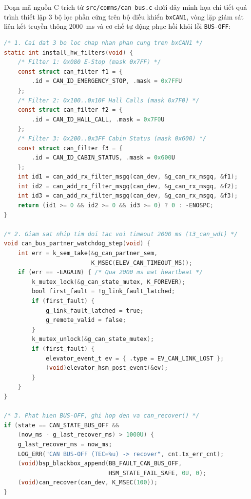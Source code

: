 \pagebreak
Đoạn mã nguồn C trích từ \texttt{src/comms/can\_bus.c} dưới đây minh họa chi tiết quá trình thiết lập 3 bộ lọc phần cứng trên bộ điều khiển \texttt{bxCAN1}, vòng lặp giám sát liên kết truyền thông 2000~ms và cơ chế tự động phục hồi khỏi lỗi \texttt{BUS-OFF}:

\begin{lstlisting}[language=C, caption={Cấu hình 3 bộ lọc phần cứng (can\_bus.c) và giám sát liên kết CAN 2000~ms (t3\_can\_wdt)}]
/* 1. Cai dat 3 bo loc chap nhan phan cung tren bxCAN1 */
static int install_hw_filters(void) {
    /* Filter 1: 0x080 E-Stop (mask 0x7FF) */
    const struct can_filter f1 = {
        .id = CAN_ID_EMERGENCY_STOP, .mask = 0x7FFU
    };
    /* Filter 2: 0x100..0x10F Hall Calls (mask 0x7F0) */
    const struct can_filter f2 = {
        .id = CAN_ID_HALL_CALL, .mask = 0x7F0U
    };
    /* Filter 3: 0x200..0x3FF Cabin Status (mask 0x600) */
    const struct can_filter f3 = {
        .id = CAN_ID_CABIN_STATUS, .mask = 0x600U
    };
    int id1 = can_add_rx_filter_msgq(can_dev, &g_can_rx_msgq, &f1);
    int id2 = can_add_rx_filter_msgq(can_dev, &g_can_rx_msgq, &f2);
    int id3 = can_add_rx_filter_msgq(can_dev, &g_can_rx_msgq, &f3);
    return (id1 >= 0 && id2 >= 0 && id3 >= 0) ? 0 : -ENOSPC;
}

/* 2. Giam sat nhip tim doi tac voi timeout 2000 ms (t3_can_wdt) */
void can_bus_partner_watchdog_step(void) {
    int err = k_sem_take(&g_can_partner_sem,
                         K_MSEC(ELEV_CAN_TIMEOUT_MS));
    if (err == -EAGAIN) { /* Qua 2000 ms mat heartbeat */
        k_mutex_lock(&g_can_state_mutex, K_FOREVER);
        bool first_fault = !g_link_fault_latched;
        if (first_fault) {
            g_link_fault_latched = true;
            g_remote_valid = false;
        }
        k_mutex_unlock(&g_can_state_mutex);
        if (first_fault) {
            elevator_event_t ev = { .type = EV_CAN_LINK_LOST };
            (void)elevator_hsm_post_event(&ev);
        }
    }
}

/* 3. Phat hien BUS-OFF, ghi hop den va can_recover() */
if (state == CAN_STATE_BUS_OFF &&
    (now_ms - g_last_recover_ms) > 1000U) {
    g_last_recover_ms = now_ms;
    LOG_ERR("CAN BUS-OFF (TEC=%u) -> recover", cnt.tx_err_cnt);
    (void)bsp_blackbox_append(BB_FAULT_CAN_BUS_OFF,
                              HSM_STATE_FAIL_SAFE, 0U, 0);
    (void)can_recover(can_dev, K_MSEC(100));
}
\end{lstlisting}


